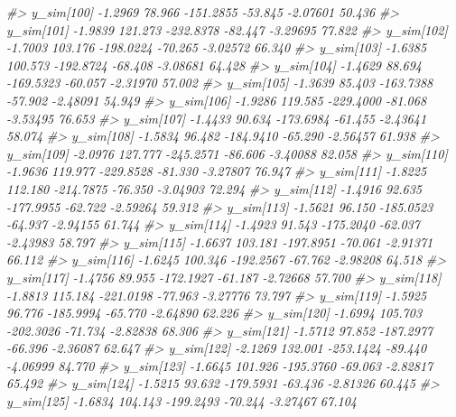 \documentclass[
  10pt,
  italian,
  a4paper,
  extrafontsizes,onecolumn,openright
  ]{memoir}
\newenvironment{Shaded}{\begin{snugshade}}{\end{snugshade}}
\newcommand{\CommentTok}[1]{\textcolor[rgb]{0.56,0.35,0.01}{\textit{#1}}}
\begin{document}
\begin{Shaded}
\begin{Highlighting}[]
\CommentTok{\#\textgreater{}   y\_sim[100] {-}1.2969  78.966 {-}151.2855 {-}53.845 {-}2.07601 50.436}
\CommentTok{\#\textgreater{}   y\_sim[101] {-}1.9839 121.273 {-}232.8378 {-}82.447 {-}3.29695 77.822}
\CommentTok{\#\textgreater{}   y\_sim[102] {-}1.7003 103.176 {-}198.0224 {-}70.265 {-}3.02572 66.340}
\CommentTok{\#\textgreater{}   y\_sim[103] {-}1.6385 100.573 {-}192.8724 {-}68.408 {-}3.08681 64.428}
\CommentTok{\#\textgreater{}   y\_sim[104] {-}1.4629  88.694 {-}169.5323 {-}60.057 {-}2.31970 57.002}
\CommentTok{\#\textgreater{}   y\_sim[105] {-}1.3639  85.403 {-}163.7388 {-}57.902 {-}2.48091 54.949}
\CommentTok{\#\textgreater{}   y\_sim[106] {-}1.9286 119.585 {-}229.4000 {-}81.068 {-}3.53495 76.653}
\CommentTok{\#\textgreater{}   y\_sim[107] {-}1.4433  90.634 {-}173.6984 {-}61.455 {-}2.43641 58.074}
\CommentTok{\#\textgreater{}   y\_sim[108] {-}1.5834  96.482 {-}184.9410 {-}65.290 {-}2.56457 61.938}
\CommentTok{\#\textgreater{}   y\_sim[109] {-}2.0976 127.777 {-}245.2571 {-}86.606 {-}3.40088 82.058}
\CommentTok{\#\textgreater{}   y\_sim[110] {-}1.9636 119.977 {-}229.8528 {-}81.330 {-}3.27807 76.947}
\CommentTok{\#\textgreater{}   y\_sim[111] {-}1.8225 112.180 {-}214.7875 {-}76.350 {-}3.04903 72.294}
\CommentTok{\#\textgreater{}   y\_sim[112] {-}1.4916  92.635 {-}177.9955 {-}62.722 {-}2.59264 59.312}
\CommentTok{\#\textgreater{}   y\_sim[113] {-}1.5621  96.150 {-}185.0523 {-}64.937 {-}2.94155 61.744}
\CommentTok{\#\textgreater{}   y\_sim[114] {-}1.4923  91.543 {-}175.2040 {-}62.037 {-}2.43983 58.797}
\CommentTok{\#\textgreater{}   y\_sim[115] {-}1.6637 103.181 {-}197.8951 {-}70.061 {-}2.91371 66.112}
\CommentTok{\#\textgreater{}   y\_sim[116] {-}1.6245 100.346 {-}192.2567 {-}67.762 {-}2.98208 64.518}
\CommentTok{\#\textgreater{}   y\_sim[117] {-}1.4756  89.955 {-}172.1927 {-}61.187 {-}2.72668 57.700}
\CommentTok{\#\textgreater{}   y\_sim[118] {-}1.8813 115.184 {-}221.0198 {-}77.963 {-}3.27776 73.797}
\CommentTok{\#\textgreater{}   y\_sim[119] {-}1.5925  96.776 {-}185.9994 {-}65.770 {-}2.64890 62.226}
\CommentTok{\#\textgreater{}   y\_sim[120] {-}1.6994 105.703 {-}202.3026 {-}71.734 {-}2.82838 68.306}
\CommentTok{\#\textgreater{}   y\_sim[121] {-}1.5712  97.852 {-}187.2977 {-}66.396 {-}2.36087 62.647}
\CommentTok{\#\textgreater{}   y\_sim[122] {-}2.1269 132.001 {-}253.1424 {-}89.440 {-}4.06999 84.770}
\CommentTok{\#\textgreater{}   y\_sim[123] {-}1.6645 101.926 {-}195.3760 {-}69.063 {-}2.82817 65.492}
\CommentTok{\#\textgreater{}   y\_sim[124] {-}1.5215  93.632 {-}179.5931 {-}63.436 {-}2.81326 60.445}
\CommentTok{\#\textgreater{}   y\_sim[125] {-}1.6834 104.143 {-}199.2493 {-}70.244 {-}3.27467 67.104}

\end{Highlighting}
\end{Shaded}
\end{document}
